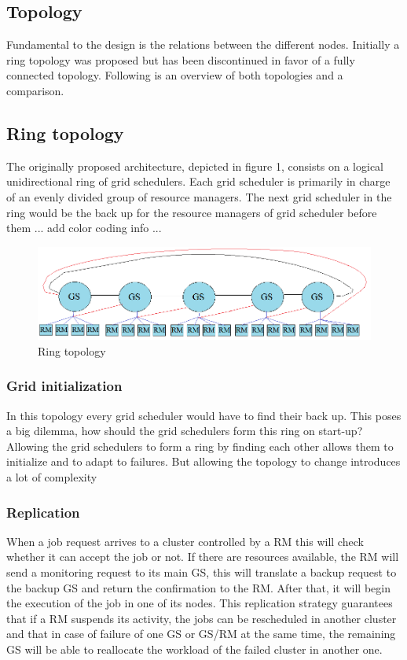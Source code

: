 \subsection{Topology}
Fundamental to the design is the relations between the different nodes.
Initially a ring topology was proposed but has been discontinued in favor of a fully connected topology.
Following is an overview of both topologies and a comparison.

\subsection{Ring topology}

The originally proposed architecture, depicted in figure 1, consists on a logical unidirectional ring of grid schedulers.
Each grid scheduler is primarily in charge of an evenly divided group of resource managers.
The next grid scheduler in the ring would be the back up for the resource managers of grid scheduler before them 
... add color coding info ...
\\ 
\begin{figure}[H]
\centering
	\includegraphics[scale=0.61]{ring.png}
	\caption{Ring topology}
\end{figure}

\subsubsection{Grid initialization}
In this topology every grid scheduler would have to find their back up.
This poses a big dilemma, how should the grid schedulers form this ring on start-up?
Allowing the grid schedulers to form a ring by finding each other allows them to initialize and to adapt to failures.
But allowing the topology to change introduces a lot of complexity

\subsubsection{Replication}
When a job request arrives to a cluster controlled by a RM this will check whether it can accept the job or not. If there are resources available, the RM will send a monitoring request to its main GS, this will translate a backup request to the backup GS and return the confirmation to the RM. After that, it will begin the execution of the job in one of its nodes. This replication strategy guarantees that if a RM suspends its activity, the jobs can be rescheduled in another cluster and that in case of failure of one GS or GS/RM at the same time, the remaining GS will be able to reallocate the workload of the failed cluster in another one.

